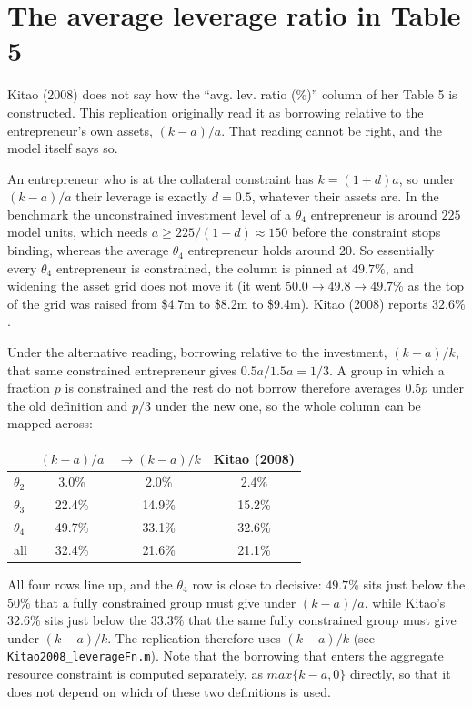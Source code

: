 \documentclass[11pt,fleqn]{article}
\begin{document}
\section{The average leverage ratio in Table 5}
Kitao (2008) does not say how the ``avg. lev. ratio (\%)'' column of her Table 5 is constructed. This replication originally read it as borrowing relative to the entrepreneur's own assets, $(k-a)/a$. That reading cannot be right, and the model itself says so.

An entrepreneur who is at the collateral constraint has $k=(1+d)a$, so under $(k-a)/a$ their leverage is exactly $d=0.5$, whatever their assets are. In the benchmark the unconstrained investment level of a $\theta_4$ entrepreneur is around $225$ model units, which needs $a \geq 225/(1+d) \approx 150$ before the constraint stops binding, whereas the average $\theta_4$ entrepreneur holds around $20$. So essentially every $\theta_4$ entrepreneur is constrained, the column is pinned at $49.7\%$, and widening the asset grid does not move it (it went $50.0 \rightarrow 49.8 \rightarrow 49.7\%$ as the top of the grid was raised from \$4.7m to \$8.2m to \$9.4m). Kitao (2008) reports $32.6\%$.

Under the alternative reading, borrowing relative to the investment, $(k-a)/k$, that same constrained entrepreneur gives $0.5a/1.5a=1/3$. A group in which a fraction $p$ is constrained and the rest do not borrow therefore averages $0.5p$ under the old definition and $p/3$ under the new one, so the whole column can be mapped across:
\begin{center}
\begin{tabular}{lccc}
\hline
 & $(k-a)/a$ & $\rightarrow (k-a)/k$ & Kitao (2008) \\ \hline
$\theta_2$ &  3.0\% &  2.0\% &  2.4\% \\
$\theta_3$ & 22.4\% & 14.9\% & 15.2\% \\
$\theta_4$ & 49.7\% & 33.1\% & 32.6\% \\
all        & 32.4\% & 21.6\% & 21.1\% \\ \hline
\end{tabular}
\end{center}
All four rows line up, and the $\theta_4$ row is close to decisive: $49.7\%$ sits just below the $50\%$ that a fully constrained group must give under $(k-a)/a$, while Kitao's $32.6\%$ sits just below the $33.3\%$ that the same fully constrained group must give under $(k-a)/k$. The replication therefore uses $(k-a)/k$ (see \texttt{Kitao2008\_leverageFn.m}). Note that the borrowing that enters the aggregate resource constraint is computed separately, as $max\{k-a,0\}$ directly, so that it does not depend on which of these two definitions is used.
\end{document}
